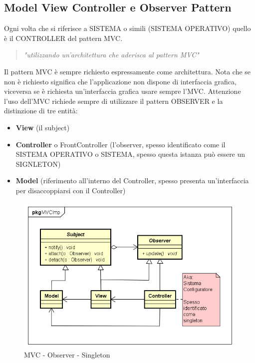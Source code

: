 \documentclass[a4paper,11pt]{article}
\begin{document}
\newpage	
	\subsection{Model View Controller e Observer Pattern}

	Ogni volta che si riferisce a SISTEMA o simili (SISTEMA OPERATIVO) quello è il CONTROLLER del pattern MVC. 
	
	\begin{quote}
		\textit{"utilizzando un'architettura che aderisca al pattern MVC"}
	\end{quote}
	
	Il pattern MVC è sempre richiesto espressamente come architettura. Nota che se non è richiesto significa che l'applicazione non dispone di interfaccia grafica, viceversa se è richiesta un'interfaccia grafica usare sempre l'MVC.
	Attenzione l'uso dell'MVC richiede sempre di utilizzare il pattern OBSERVER e la distinzione di tre entità:
	\begin{itemize}
		\item \textbf{View} (il subject)
		\item \textbf{Controller} o FrontController (l'observer, spesso identificato come il SISTEMA OPERATIVO o SISTEMA, spesso questa istanza può essere un SIGNLETON)
		\item \textbf{Model} (riferimento all'interno del Controller, spesso presenta un'interfaccia per disaccoppiarsi con il Controller)
	\end{itemize}
					
				\begin{figure} [h]
					\centering
					\includegraphics[width=\textwidth]{classDiagramPattern/MVCImp/MVC-Observer-Singleton}
					\caption{MVC - Observer - Singleton}
					\label{fig:MVC-Observer-Singleton}
				\end{figure}
	
\end{document}
